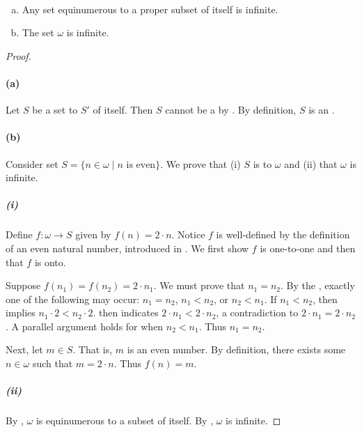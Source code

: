\documentclass{report}
\begin{document}
  \begin{corollary}[6D]
    \  %
    \begin{enumerate}[(a)]
      \item Any set equinumerous to a proper subset of itself is infinite.
      \item The set $\omega$ is infinite.
    \end{enumerate}
  \end{corollary}

  \begin{proof}

    \paragraph{(a)}%

      Let $S$ be a set  to 
        $S'$ of itself.
      Then $S$ cannot be a  by
        .
      By definition, $S$ is an .

    \paragraph{(b)}%

      Consider set $S = \{n \in \omega \mid n \text{ is even}\}$.
      We prove that (i) $S$ is  to $\omega$ and (ii)
        that $\omega$ is infinite.

      \subparagraph{(i)}%

        Define $f \colon \omega \rightarrow S$ given by $f(n) = 2 \cdot n$.
        Notice $f$ is well-defined by the definition of an even natural number,
          introduced in .
        We first show $f$ is one-to-one and then that $f$ is onto.

        Suppose $f(n_1) = f(n_2) = 2 \cdot n_1$.
        We must prove that $n_1 = n_2$.
        By the , exactly one of the
          following may occur: $n_1 = n_2$, $n_1 < n_2$, or $n_2 < n_1$.
        If $n_1 < n_2$, then  implies
          $n_1 \cdot 2 < n_2 \cdot 2$.
         then indicates $2 \cdot n_1 < 2 \cdot n_2$,
          a contradiction to $2 \cdot n_1 = 2 \cdot n_2$.
        A parallel argument holds for when $n_2 < n_1$.
        Thus $n_1 = n_2$.

        Next, let $m \in S$.
        That is, $m$ is an even number.
        By definition, there exists some $n \in \omega$ such that
          $m = 2 \cdot n$.
        Thus $f(n) = m$.

      \subparagraph{(ii)}%

        By , $\omega$ is equinumerous to a subset
          of itself.
        By , $\omega$ is infinite.

  \end{proof}
\end{document}

